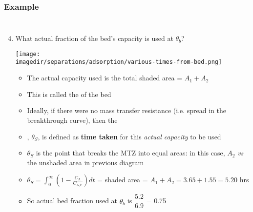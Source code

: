 \begin{frame}\frametitle{Example}
	\vspace{-12pt}
	\begin{columns}[t]
		\begin{enumerate}
			\setcounter{enumi}{3}
			\item	What actual fraction of the bed's capacity is used at $\theta_b$?
				\begin{center}
					\texttt{[image: \\imagedir/separations/adsorption/various-times-from-bed.png]}
				\end{center}
				\vspace{-12pt}
				\begin{itemize}
					\item	The actual capacity used is the total shaded area = $A_1 + A_2$
					\item	This is called the {\color{purple}{stoichiometric capacity}} of the bed
					\item	Ideally, if there were no mass transfer resistance (i.e. spread in the breakthrough curve), then the
					\item	{\color{purple}{stoichiometric time}}, $\theta_S$, is defined as \textbf{time taken} for this \emph{actual capacity} to be used
					\item	$\theta_S$ is the point that breaks the MTZ into equal areas: in this case, $A_2$ \emph{vs} the unshaded area in previous diagram
					\vspace{2pt}
					\item	{\scriptsize $\theta_S = \displaystyle \int_0^{\infty}{\left(1-\frac{C_\text{A}}{C_\text{A,F}} \right)dt}$ = shaded area = $A_1 + A_2 = 3.65 + 1.55 = 5.20$ hrs}
					\item	So actual bed fraction used at $\theta_b$ is $\dfrac{5.2}{6.9}$ = 0.75 {\color{myOrange}{$\sim75\%$}}
				\end{itemize}
		\end{enumerate}
	\end{columns}
\end{frame}


